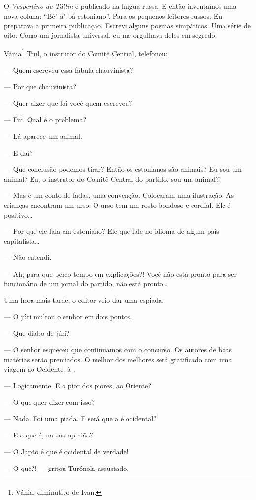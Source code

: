 O \emph{Vespertino de Tállin} é publicado na língua russa. E então
inventamos uma nova coluna: ``Bê"-á"-bá estoniano''. Para os pequenos
leitores russos. Eu preparava a primeira publicação. Escrevi alguns
poemas simpáticos. Uma série de oito. Como um jornalista universal, eu
me orgulhava deles em segredo.

Vánia\footnote{Vánia, diminutivo de Ivan.} Trul, o instrutor do Comitê Central, telefonou:

--- Quem escreveu essa fábula chauvinista?

--- Por que chauvinista?

--- Quer dizer que foi você quem escreveu?

--- Fui. Qual é o problema?

--- Lá aparece um animal.

--- E daí?

--- Que conclusão podemos tirar? Então os estonianos são animais? Eu sou
um animal? Eu, o instrutor do Comitê Central do partido, sou um animal?!

--- Mas é um conto de fadas, uma convenção. Colocaram uma ilustração. As
crianças encontram um urso. O urso tem um rosto bondoso e cordial. Ele é
positivo\ldots{}

--- Por que ele fala em estoniano? Ele que fale no idioma de algum país
capitalista\ldots{}

--- Não entendi.

--- Ah, para que perco tempo em explicações?! Você não está pronto para
ser funcionário de um jornal do partido, não está pronto\ldots{}

Uma hora mais tarde, o editor veio dar uma espiada.

--- O júri multou o senhor em dois pontos.

--- Que diabo de júri?

--- O senhor esqueceu que continuamos com o concurso. Os autores de boas
matérias serão premiados. O melhor dos melhores será gratificado com uma
viagem ao Ocidente, à .

--- Logicamente. E o pior dos piores, ao Oriente?

--- O que quer dizer com isso?

--- Nada. Foi uma piada. E será que a  é ocidental?

--- E o que é, na sua opinião?

--- O Japão é que é ocidental de verdade!

--- O quê?! --- gritou Turónok, assustado.

